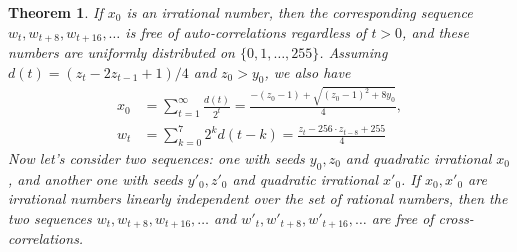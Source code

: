 \documentclass[oneside,10pt]{book}
\newtheorem{theorem}{Theorem}[section]
\begin{document}
\begin{theorem}\label{vgfd2}
If $x_0$ is an irrational number, then the corresponding sequence  
 $w_t,w_{t+8}, w_{t+16},\dots$  is free of auto-correlations regardless of $t>0$, and these numbers
 are uniformly distributed on $\{0, 1,\dots, 255\}$. 
Assuming $d(t) = (z_t - 2z_{t-1} + 1)/4$ and $z_0 > y_0$, we also have
\begin{align}
x_0 & = \sum_{t=1}^\infty \frac{d(t)}{2^t} = \frac{-(z_0 -1) + \sqrt{(z_0-1)^2+8y_0}}{4},  \label{popot2i}\\
w_t & = \sum_{k=0}^7 2^k d(t-k) =  \frac{z_t - 256\cdot z_{t-8} + 255}{4}  \label{popot2}
\end{align}
Now let's consider two sequences: one with seeds $y_0, z_0$ and quadratic irrational $x_0$, and another one with seeds $y'_0, z'_0$ and 
quadratic irrational $x'_0$. If $x_0, x'_0$ are irrational numbers linearly independent over the set of rational numbers, then
 the two sequences $w_t,w_{t+8}, w_{t+16},\dots$ and $w'_t,w'_{t+8}, w'_{t+16},\dots$ are free of cross-correlations. 


\end{theorem}
\end{document}
